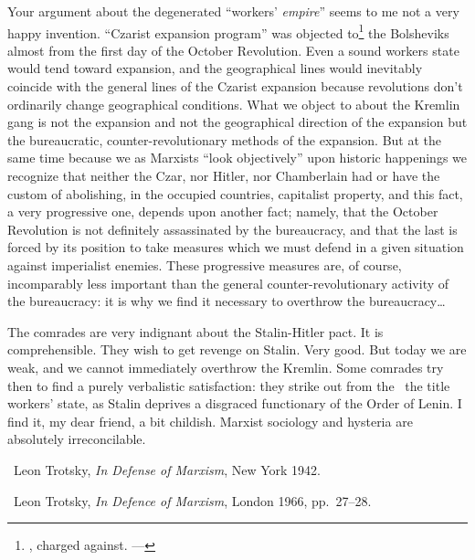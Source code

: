Your argument about the degenerated “workers’ \emph{empire}” seems to me not a very happy invention. “Czarist expansion program” was objected to\footnote{\ie, charged against. ---\ed} the Bolsheviks almost from the first day of the October Revolution. Even a sound workers state would tend toward expansion, and the geographical lines would inevitably coincide with the general lines of the Czarist expansion because revolutions don’t ordinarily change geographical conditions. What we object to about the Kremlin gang is not the expansion and not the geographical direction of the expansion but the bureaucratic, counter-revolutionary methods of the expansion. But at the same time because we as Marxists “look objectively” upon historic happenings we recognize that neither the Czar, nor Hitler, nor Chamberlain had or have the custom of abolishing, in the occupied countries, capitalist property, and this fact, a very progressive one, depends upon another fact; namely, that the October Revolution is not definitely assassinated by the bureaucracy, and that the last is forced by its position to take measures which we must defend in a given situation against imperialist enemies. These progressive measures are, of course, incomparably less important than the general counter-revolutionary activity of the bureaucracy: it is why we find it necessary to overthrow the bureaucracy\dots

The comrades are very indignant about the Stalin-Hitler pact. It is comprehensible. They wish to get revenge on Stalin. Very good. But today we are weak, and we cannot immediately overthrow the Kremlin. Some comrades try then to find a purely verbalistic satisfaction: they strike out from the \USSR\ the title workers’ state, as Stalin deprives a disgraced functionary of the Order of Lenin. I find it, my dear friend, a bit childish. Marxist sociology and hysteria are absolutely irreconcilable.


\enlargethispage{2\baselineskip}

\begin{letterinfo}
	\firstpublished\ Leon Trotsky, \emph{In Defense of Marxism}, New York 1942.
	
	\checkedagainst\ Leon Trotsky, \emph{In Defence of Marxism}, London 1966, pp.~27--28.
	
    \footnoteslatter
\end{letterinfo}
